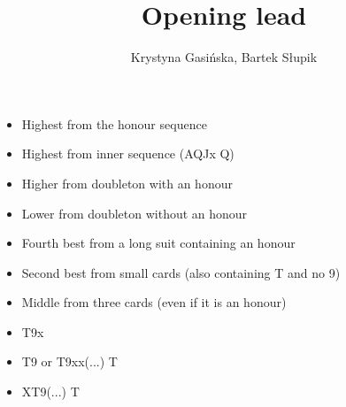 \documentclass[12pt, a4paper]{article}
\title{Opening lead}
\author{Krystyna Gasińska, Bartek Słupik}
\begin{document}
\maketitle


\begin{itemize}
    \item Highest from the honour sequence
    \item Highest from inner sequence (AQJx \then Q)
    \item Higher from doubleton with an honour
    \item Lower from doubleton without an honour
    \item Fourth best from a long suit containing an honour
    \item Second best from small cards (also containing T and no 9)
    \item Middle from three cards (even if it is an honour)
    \item T9x 
    \item T9 or T9xx(...) \then T
    \item XT9(...) \then T
\end{itemize}


\end{document}
